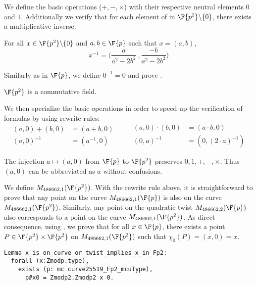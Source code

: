 We define the basic operations ($+, -, \times$) with their respective neutral
elements $0$ and $1$. Additionally we verify that for each element of in
$\F{p^2}\backslash\{0\}$, there exists a multiplicative inverse.
\begin{lemma}
  \label{lemma:Zmodp2_inv}
  For all $x \in \F{p^2}\backslash\{0\}$ and $a,b \in \F{p}$ such that $x = (a,b)$,
  $$x^{-1} = \Big(\frac{a}{a^2-2b^2}\ , \frac{-b}{a^2-2b^2}\Big)$$
\end{lemma}
Similarly as in $\F{p}$, we define $0^{-1} = 0$ and prove .
\begin{lemma}
  \label{lemma:Zmodp2_field}
  $\F{p^2}$ is a commutative field.
\end{lemma}

We then specialize the basic operations in order to speed up the verification
of formulas by using rewrite rules:
\begin{equation*}
\begin{split}
(a,0) + (b,0) &= (a+b, 0)\\
(a, 0)^{-1} &= (a^{-1}, 0)
\end{split}
\qquad
\begin{split}
(a,0) \cdot   (b,0) &= (a \cdot b, 0)\\
(0,a)^{-1} &= (0,(2\cdot a)^{-1})
\end{split}
\end{equation*}

The injection $a \mapsto (a,0)$ from $\F{p}$ to $\F{p^2}$ preserves
$0, 1, +, -, \times$. Thus $(a,0)$ can be abbreviated as $a$ without confusions.

We define $M_{486662,1}(\F{p^2})$. With the rewrite rule above, it is straightforward
to prove that any point on the curve $M_{486662,1}(\F{p})$ is also on the curve
$M_{486662,1}(\F{p^2})$. Similarly, any point on the quadratic twist
$M_{486662,2}(\F{p})$ also corresponds to a point on the curve $M_{486662,1}(\F{p^2})$.
As direct consequence, using , we prove that for all
$x \in \F{p}$, there exists a point $P \in \F{p^2}\times\F{p^2}$ on
$M_{486662,1}(\F{p^2})$ such that $\chi_0(P) = (x,0) = x$.

\begin{lstlisting}[language=Coq,belowskip=-0.25 \baselineskip]
Lemma x_is_on_curve_or_twist_implies_x_in_Fp2:
  forall (x:Zmodp.type),
    exists (p: mc curve25519_Fp2_mcuType),
      p#x0 = Zmodp2.Zmodp2 x 0.
\end{lstlisting}

